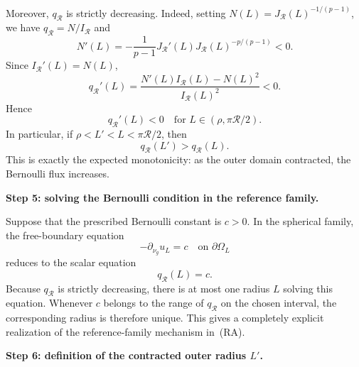 \documentclass[11pt,a4paper]{article}
\theoremstyle{definition}
\theoremstyle{remark}
\begin{document}
Moreover, $q_{\mathcal R}$ is strictly decreasing. Indeed, setting
$N(L)=J_{\mathcal R}(L)^{-1/(p-1)}$, we have
$q_{\mathcal R}=N/I_{\mathcal R}$ and
\[
N'(L)
=-\frac1{p-1}J_{\mathcal R}'(L)
J_{\mathcal R}(L)^{-p/(p-1)}<0.
\]
Since $I_{\mathcal R}'(L)=N(L)$,
\[
q_{\mathcal R}'(L)
=\frac{N'(L)I_{\mathcal R}(L)-N(L)^2}
{I_{\mathcal R}(L)^2}<0.
\]
Hence
\[
q_{\mathcal R}'(L)<0
\quad\text{for }L\in(\rho,\pi\mathcal R/2).
\]
In particular, if $\rho<L'<L<\pi\mathcal R/2$, then
\[
q_{\mathcal R}(L')>q_{\mathcal R}(L).
\]
This is exactly the expected monotonicity: as the outer domain
contracted, the Bernoulli flux increases.

\medskip
\noindent
\textbf{Step 5: solving the Bernoulli condition in the reference family.}

Suppose that the prescribed Bernoulli constant is $c>0$. In the spherical
family, the free-boundary equation
\[
-\partial_{\nu_g}u_L=c
\quad\text{on }\partial\Omega_L
\]
reduces to the scalar equation
\[
q_{\mathcal R}(L)=c.
\]
Because $q_{\mathcal R}$ is strictly decreasing, there is at most one
radius $L$ solving this equation. Whenever $c$ belongs to the range of
$q_{\mathcal R}$ on the chosen interval, the corresponding radius is
therefore unique. This gives a completely explicit realization of the
reference-family mechanism in~{\rm (RA)}.

\medskip
\noindent
\textbf{Step 6: definition of the contracted outer radius $L'$.}
\end{document}
